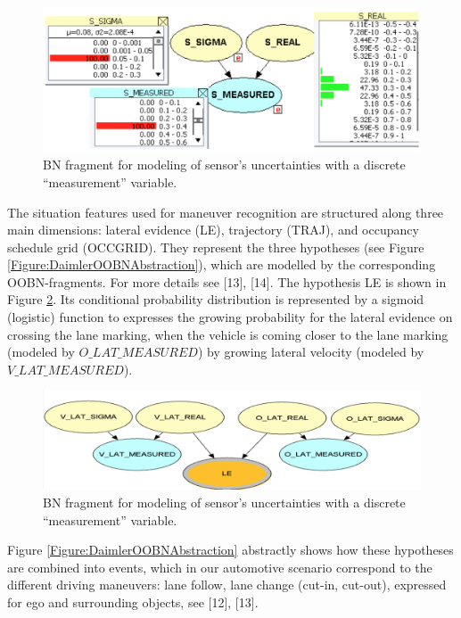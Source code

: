 \begin{figure}
\begin{center}
\includegraphics[scale=0.35]{./figures/DaimlerSensorModelling}
\caption{\label{Figure:DaimlerSensorModelling} BN fragment for modeling of sensor’s uncertainties with a discrete ``measurement'' variable.}
\end{center}
\end{figure}


The situation features used for maneuver recognition are structured along three main dimensions: lateral evidence (LE), trajectory (TRAJ), and occupancy schedule grid (OCCGRID). They represent the three hypotheses (see Figure \ref{Figure:DaimlerOOBNAbstraction}), which are modelled by the corresponding OOBN-fragments. For more details see [13], [14]. The hypothesis LE is shown in Figure \ref{Figure:DaimlerLE}. Its conditional probability distribution is represented by a sigmoid (logistic) function to expresses the growing probability for the lateral evidence on crossing the lane marking, when the vehicle is coming closer to the lane marking (modeled by $O\_LAT\_MEASURED$) by growing lateral velocity (modeled by $V\_LAT\_ MEASURED$).

\begin{figure}
\begin{center}
\includegraphics[scale=0.35]{./figures/DaimlerLE}
\caption{\label{Figure:DaimlerLE} BN fragment for modeling of sensor’s uncertainties with a discrete ``measurement'' variable.}
\end{center}
\end{figure}

Figure \ref{Figure:DaimlerOOBNAbstraction} abstractly shows how these hypotheses are combined into events, which in our automotive scenario correspond to the different driving maneuvers: lane follow, lane change (cut-in, cut-out), expressed for ego and surrounding objects, see [12], [13].


